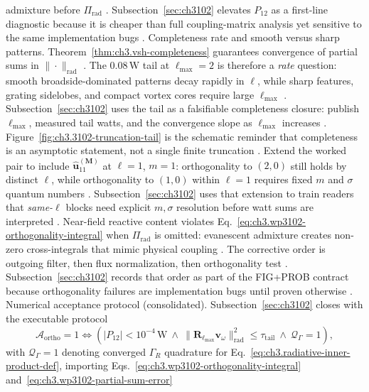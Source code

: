 admixture before \(\Pi_{\mathrm{rad}}\) \cite{harrington2001}. Subsection~\ref{sec:ch3102} elevates \(P_{12}\) as a first-line
diagnostic because it is cheaper than full coupling-matrix analysis yet sensitive to the same implementation bugs \cite{devaney2004}.
Completeness rate and smooth versus sharp patterns. Theorem~\ref{thm:ch3.vsh-completeness} guarantees convergence of partial sums in \(\|\cdot\|_{\mathrm{rad}}\) \cite{kato1995}.
The \(0.08\,\mathrm{W}\) tail at \(\ell_{\max}=2\) is therefore a \emph{rate} question: smooth broadside-dominated patterns decay rapidly in
\(\ell\), while sharp features, grating sidelobes, and compact vortex cores require large \(\ell_{\max}\) \cite{harrington2001}.
Subsection~\ref{sec:ch3102} uses the tail as a falsifiable completeness closure: publish \(\ell_{\max}\), measured tail watts, and the
convergence slope as \(\ell_{\max}\) increases \cite{stratton1941}. Figure~\ref{fig:ch3.3102-truncation-tail} is the schematic
reminder that completeness is an asymptotic statement, not a single finite truncation \cite{kato1995}.
Extend the worked pair to include \(\widehat{\mathbf{u}}_{11}^{(\mathbf{M})}\) at \(\ell=1\), \(m=1\): orthogonality to \((2,0)\) still holds by
distinct \(\ell\), while orthogonality to \((1,0)\) within \(\ell=1\) requires fixed \(m\) and \(\sigma\) quantum numbers
\cite{jackson1999}. Subsection~\ref{sec:ch3102} uses that extension to train readers that \emph{same-\(\ell\)} blocks need explicit
\(m,\sigma\) resolution before watt sums are interpreted \cite{harrington2001}.
Near-field reactive content violates Eq.~\eqref{eq:ch3.wp3102-orthogonality-integral} when \(\Pi_{\mathrm{rad}}\) is omitted: evanescent admixture
creates non-zero cross-integrals that mimic physical coupling \cite{stratton1941}. The corrective order is outgoing filter, then flux
normalization, then orthogonality test \cite{harrington2001}. Subsection~\ref{sec:ch3102} records that order as part of the FIG+PROB
contract because orthogonality failures are implementation bugs until proven otherwise \cite{hansen1988}.
Numerical acceptance protocol (consolidated). Subsection~\ref{sec:ch3102} closes with the executable protocol
\begin{equation}
\label{eq:ch3.wp3102-acceptance-protocol}
\mathcal{A}_{\mathrm{ortho}}=1
\iff
\left(
|P_{12}|<10^{-4}\,\mathrm{W}\
\wedge\
\|\mathbf{R}_{\ell_{\max}}\mathbf{v}_\omega\|_{\mathrm{rad}}^{2}\le\tau_{\mathrm{tail}}\
\wedge\
\mathcal{Q}_{\Gamma}=1
\right),
\end{equation}
with \(\mathcal{Q}_{\Gamma}=1\) denoting converged \(\Gamma_R\) quadrature for Eq.~\eqref{eq:ch3.radiative-inner-product-def}, importing Eqs.~\eqref{eq:ch3.wp3102-orthogonality-integral} and~\eqref{eq:ch3.wp3102-partial-sum-error}
